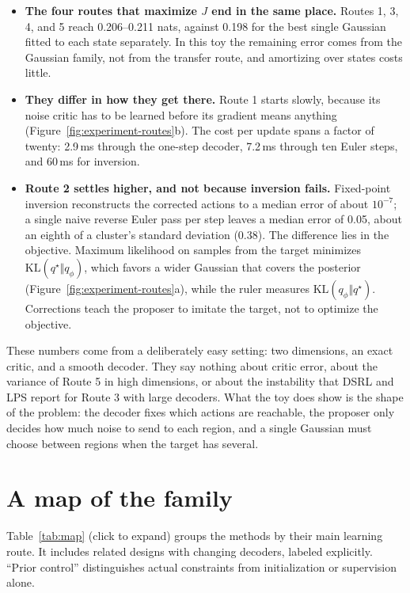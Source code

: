 \begin{itemize}
\item \textbf{The four routes that maximize $J$ end in the same place.} Routes 1, 3, 4, and 5 reach 0.206--0.211 nats, against 0.198 for the best single Gaussian fitted to each state separately. In this toy the remaining error comes from the Gaussian family, not from the transfer route, and amortizing over states costs little.
\item \textbf{They differ in how they get there.} Route 1 starts slowly, because its noise critic has to be learned before its gradient means anything (Figure~\ref{fig:experiment-routes}b). The cost per update spans a factor of twenty: 2.9\,ms through the one-step decoder, 7.2\,ms through ten Euler steps, and 60\,ms for inversion.
\item \textbf{Route 2 settles higher, and not because inversion fails.} Fixed-point inversion reconstructs the corrected actions to a median error of about $10^{-7}$; a single naive reverse Euler pass per step leaves a median error of 0.05, about an eighth of a cluster's standard deviation (0.38). The difference lies in the objective. Maximum likelihood on samples from the target minimizes $\mathrm{KL}(q^\star \Vert q_\phi)$, which favors a wider Gaussian that covers the posterior (Figure~\ref{fig:experiment-routes}a), while the ruler measures $\mathrm{KL}(q_\phi \Vert q^\star)$. Corrections teach the proposer to imitate the target, not to optimize the objective.
\end{itemize}

These numbers come from a deliberately easy setting: two dimensions, an exact critic, and a smooth decoder. They say nothing about critic error, about the variance of Route 5 in high dimensions, or about the instability that DSRL and LPS report for Route 3 with large decoders. What the toy does show is the shape of the problem: the decoder fixes which actions are reachable, the proposer only decides how much noise to send to each region, and a single Gaussian must choose between regions when the target has several.

\section{A map of the family}
\label{sec:5}
Table~\ref{tab:map} (click to expand) groups the methods by their main learning route. It includes related designs with changing decoders, labeled explicitly. ``Prior control'' distinguishes actual constraints from initialization or supervision alone.


